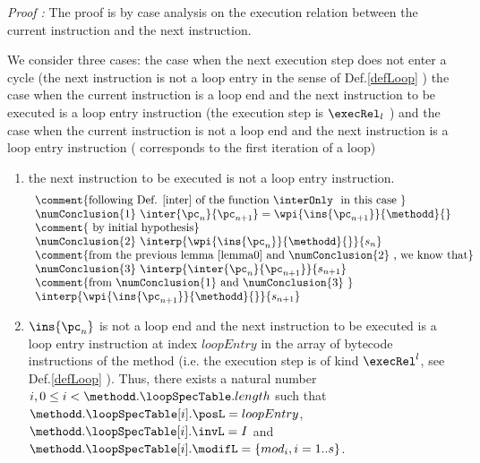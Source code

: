 \textit{Proof :}
The proof is by case analysis on the execution relation \execRel{}  between the current instruction and the next instruction.

 We consider three cases: the case when the next execution step does not enter a cycle (the next instruction is not a loop entry in the sense of Def.\ref{defLoop} )
the case when the current instruction is a loop end and the next instruction to be executed is a loop entry instruction (the execution step is $\execRel_l$ )
and the case when the current instruction is not a loop end and the next instruction is a loop entry instruction ( corresponds to the first iteration of a loop) 

  
\begin{enumerate}
  \item the next instruction to be executed is not a loop entry instruction. 
           $$ \begin{array}{l}
	      \mbox{\rm \comment{following Def. \ref{inter} of the function \interOnly \ in this case }}\\
              \numConclusion{1} \ \inter{\pc_n}{\pc_{n+1}} = \wpi{ \ins{\pc_{n+1} }}{\methodd}{}\\
	      \mbox{\rm \comment{ by initial hypothesis}} \\
	      \numConclusion{2} \ \interp{\wpi{\ins{\pc_{n}} }{ \methodd }{} }{ s_n }\\
	      \mbox{\rm \comment{from the previous lemma \ref{lemma0} and \numConclusion{2} , we know that}}\\
	      \numConclusion{3} \   \interp{\inter{\pc_n}{\pc_{n+1}} }{ s_{n+1} }\\
	      \mbox{\rm \comment{from \numConclusion{1} and  \numConclusion{3} }}\\
	      \interp{ \wpi{\ins{\pc_{n+1}}}{\methodd}{} }{ s_{n+1} }
	      \end{array}$$

 
  
\item $\ins{\pc_n} $ is not a loop end and the next instruction to be executed is a loop entry 
instruction at index $loopEntry $ in the array of bytecode instructions of the method \methodd{}
 (i.e. the execution step is of kind $\execRel^l$, see Def.\ref{defLoop}  ).
 Thus, there exists a natural number  $ i , 0 \le i < \methodd.\loopSpecTable.length   $   such that
 $ \methodd. \loopSpecTable[i].\posL = loopEntry $,  $ \methodd. \loopSpecTable[i].\invL = I $ and
   $ \methodd. \loopSpecTable[i].\modifL =\{ mod_i, i = 1..s \}$.


\end{enumerate}
